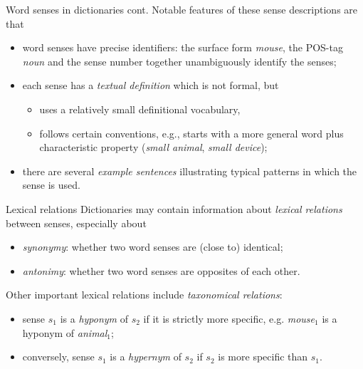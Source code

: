 \documentclass[style=upen, size=14pt]{powerdot}
\newcommand{\gold}{\color{arany}}
\theoremstyle{definition}
\begin{document}
\begin{slide}[toc=]{Word senses in dictionaries cont.}
  Notable features of these sense descriptions are that
  \begin{itemize}
  \item word senses have precise identifiers: the surface form \emph{mouse}, the
    POS-tag \emph{noun} and the sense number together unambiguously identify the
    senses;
  \item each sense has a \emph{\gold textual definition} which is not formal,
    but
    \begin{itemize}
    \item uses a relatively small definitional vocabulary,
    \item follows certain conventions, e.g., starts with a more general word
      plus characteristic property (\emph{small animal}, \emph{small device});
    \end{itemize}
  \item there are several \emph{\gold example sentences} illustrating typical
    patterns in which the sense is used.
  \end{itemize}
\end{slide}

\begin{slide}[toc=Lexical relations]{Lexical relations}
  Dictionaries may contain information about \emph{\gold lexical relations}
  between senses, especially about
  \begin{itemize}
  \item \emph{\gold synonymy}: whether two word senses are (close to) identical;
  \item \emph{\gold antonimy}: whether two word senses are opposites of each other.
  \end{itemize}
  Other important lexical relations include \emph{\gold taxonomical relations}:
  \begin{itemize}
  \item sense $s_1$ is a \emph{\gold hyponym} of $s_2$ if it is strictly more
    specific, e.g. \emph{mouse$_1$} is a hyponym of \emph{animal$_1$};
  \item conversely, sense $s_1$ is a \emph{\gold hypernym} of $s_2$ if $s_2$ is
    more specific than $s_1$.
  \end{itemize}
\end{slide}
\end{document}
